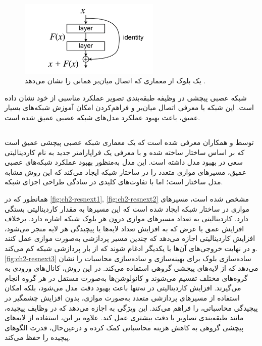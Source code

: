 \begin{figure}[h]
    \centering
    \includegraphics[width=0.6\textwidth]{Images/Chapter2/ResBlock.png}
    \caption{یک بلوک از معماری 
    که اتصال  میان‌بر همانی را نشان می‌دهد
    \cite{wikipediaResidualNeural}.}
    \label{fig:ch-2resnet_block}
\end{figure}
شبکه عصبی پیچشی 
 در وظیفه طبقه‌بندی تصویر عملکرد مناسبی از خود نشان داده است. این شبکه با معرفی اتصال  میان‌بر و  فراهم‌کردن امکان آموزش شبکه‌های بسیار عمیق، باعث بهبود عملکرد مدل‌های شبکه عصبی عمیق شده‌ است.


\subsection{}

توسط 
\cite{xie2017aggregated}
و همکاران معرفی شده است که 
یک معماری شبکه عصبی پیچشی عمیق است که بر اساس ساختار 
ساخته شده و با معرفی یک فراپارامتر
 جدید به نام کاردینالیتی
  سعی در بهبود مدل 
  داشته است.
 این مدل به‌منظور بهبود عملکرد شبکه‌های عصبی عمیق،  مسیرهای موازی متعدد را در ساختار شبکه ایجاد می‌کند که این روش مشابه مدل ساختار
است؛ اما با تفاوت‌های کلیدی در سادگی طراحی اجزای شبکه.

همانطور که در 
\autoref{fig:ch2-resnext1}, \autoref{fig:ch2-resnext2}
مشخص شده است، مسیرهای موازی در ساختار شبکه ایجاد شده است که این مسیرها به مقدار کاردینالیتی بستگی دارد.
کاردینالیتی به تعداد مسیرهای موازی درون هر بلوک شبکه اشاره دارد. برخلاف افزایش عمق یا عرض که به افزایش تعداد لایه‌ها یا پیچیدگی هر لایه منجر می‌شود، افزایش کاردینالیتی اجازه می‌دهد که چندین مسیر پردازشی به‌صورت موازی عمل کنند و در نهایت خروجی‌های آن‌ها با یکدیگر ادغام شوند که از بار پردازشی شبکه کم می‌کند.
\autoref{fig:ch2-resnext3}
ساده‌سازی بلوک 
برای بهینه‌سازی و ساده‌سازی محاسبات را نشان می‌دهد که از لایه‌های پیچشی گروهی استفاده می‌کند. در این روش، کانال‌های 
ورودی به گروه‌های مختلف تقسیم می‌شوند و کانولوشن‌ها به‌صورت مستقل در هر گروه انجام می‌گیرند.
افزایش کاردینالیتی در  نه‌تنها باعث بهبود دقت مدل می‌شود، بلکه امکان استفاده از مسیرهای پردازشی متعدد به‌صورت موازی، بدون افزایش چشمگیر در پیچیدگی محاسباتی، را فراهم می‌کند. این ویژگی به  اجازه می‌دهد که در وظایف پیچیده، مانند طبقه‌بندی تصاویر با دقت بیشتری عمل کند. علاوه بر این، استفاده از لایه‌های پیچشی گروهی به کاهش هزینه محاسباتی کمک کرده و درعین‌حال، قدرت الگوهای پیچیده را حفظ می‌کند.

